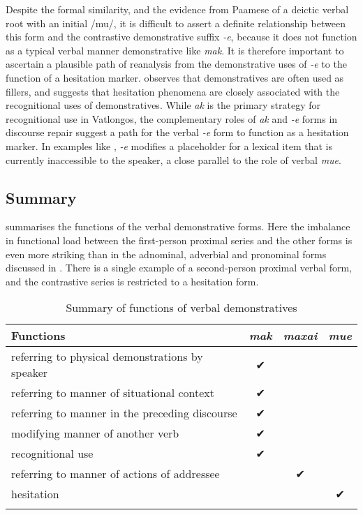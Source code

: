 \documentclass[output=paper,colorlinks,citecolor=brown]{langscibook}
\begin{document}
Despite the formal similarity, and the evidence from Paamese of a deictic verbal root with an initial /mu/, it is difficult to assert a definite relationship between this form and the contrastive demonstrative suffix \textit{-e}, because it does not function as a typical verbal manner demonstrative like \textit{mak}. It is therefore important to ascertain a plausible path of reanalysis from the demonstrative uses of \textit{-e} to the function of a hesitation marker. \citet[234-235]{Himmelmann1996} observes that demonstratives are often used as fillers, and suggests that hesitation phenomena are closely associated with the recognitional uses of demonstratives. While \textit{ak} is the primary strategy for recognitional use in Vatlongos, the complementary roles of \textit{ak} and \textit{-e} forms in discourse repair suggest a path for the verbal \textit{-e} form to function as a hesitation marker. In examples like , \textit{-e} modifies a placeholder for a lexical item that is currently inaccessible to the speaker, a close parallel to the role of verbal \textit{mue}.


\subsection{Summary}
\label{sec:ridge:5.5}

 summarises the functions of the verbal demonstrative forms. Here the imbalance in functional load between the first-person proximal series and the other forms is even more striking than in the adnominal, adverbial and pronominal forms discussed in . There is a single example of a second-person proximal verbal form, and the contrastive series is restricted to a hesitation form.

\begin{table}
\caption{\label{tab:ridge:10}Summary of functions of verbal demonstratives}
\begin{tabularx}{\textwidth}{Qccc}
\lsptoprule
\textbf{Functions} & \textbf{\textit{mak}} & \textbf{\textit{maxai}} & \textbf{\textit{mue}}\\
\midrule 
referring to physical demonstrations by speaker & ✔ &  & \\
referring to manner of situational context & ✔ &  & \\
referring to manner in the preceding discourse & ✔ &  & \\
modifying manner of another verb & ✔ &  & \\
recognitional use & ✔ &  & \\
referring to manner of actions of addressee &  & ✔ & \\
{hesitation} &  &  & {✔}\\
\lspbottomrule
\end{tabularx}
\end{table}
\end{document}

